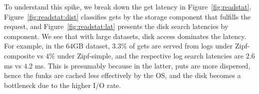  To understand this spike, 
we break down the get latency in  Figure~\ref{fig:readstat}. 
Figure~\ref{fig:readstat:dist} classifies gets by the storage  component 
that fulfills the request, and Figure~\ref{fig:readstat:lat} presents the disk search latencies by component. 
We see that with large datasets, disk access dominates the latency.
For example, in the 64GB dataset, $3.3\%$ of gets are served from logs under Zipf-composite vs $4\%$ under Zipf-simple,
and the respective log search latencies are $2.6$ ms vs $4.2$ ms. This is presumably because in the latter, puts are more dispersed, 
hence the funks are cached less effectively by the OS, and the disk becomes a bottleneck due to the higher I/O rate.

